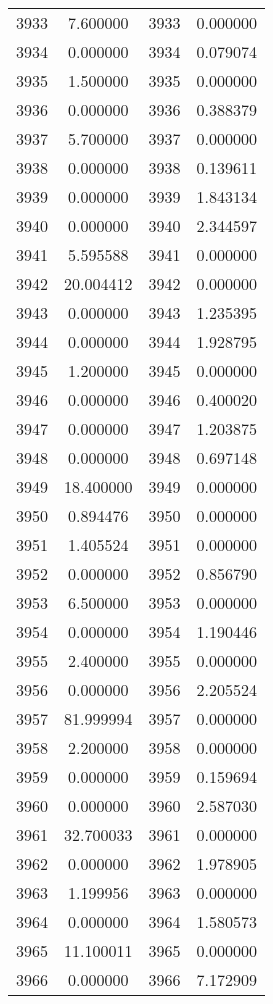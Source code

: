 \documentclass[12pt]{article}
\begin{document}
\begin{longtable}{@{}cccc@{}}
3933 & 7.600000 & 3933 & 0.000000 \\
3934 & 0.000000 & 3934 & 0.079074 \\
3935 & 1.500000 & 3935 & 0.000000 \\
3936 & 0.000000 & 3936 & 0.388379 \\
3937 & 5.700000 & 3937 & 0.000000 \\
3938 & 0.000000 & 3938 & 0.139611 \\
3939 & 0.000000 & 3939 & 1.843134 \\
3940 & 0.000000 & 3940 & 2.344597 \\
3941 & 5.595588 & 3941 & 0.000000 \\
3942 & 20.004412 & 3942 & 0.000000 \\
3943 & 0.000000 & 3943 & 1.235395 \\
3944 & 0.000000 & 3944 & 1.928795 \\
3945 & 1.200000 & 3945 & 0.000000 \\
3946 & 0.000000 & 3946 & 0.400020 \\
3947 & 0.000000 & 3947 & 1.203875 \\
3948 & 0.000000 & 3948 & 0.697148 \\
3949 & 18.400000 & 3949 & 0.000000 \\
3950 & 0.894476 & 3950 & 0.000000 \\
3951 & 1.405524 & 3951 & 0.000000 \\
3952 & 0.000000 & 3952 & 0.856790 \\
3953 & 6.500000 & 3953 & 0.000000 \\
3954 & 0.000000 & 3954 & 1.190446 \\
3955 & 2.400000 & 3955 & 0.000000 \\
3956 & 0.000000 & 3956 & 2.205524 \\
3957 & 81.999994 & 3957 & 0.000000 \\
3958 & 2.200000 & 3958 & 0.000000 \\
3959 & 0.000000 & 3959 & 0.159694 \\
3960 & 0.000000 & 3960 & 2.587030 \\
3961 & 32.700033 & 3961 & 0.000000 \\
3962 & 0.000000 & 3962 & 1.978905 \\
3963 & 1.199956 & 3963 & 0.000000 \\
3964 & 0.000000 & 3964 & 1.580573 \\
3965 & 11.100011 & 3965 & 0.000000 \\
3966 & 0.000000 & 3966 & 7.172909 \\

\end{longtable}
\end{document}
